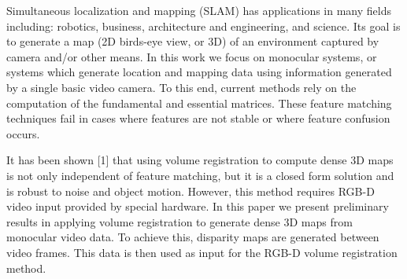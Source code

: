 Simultaneous localization and mapping (SLAM) has applications in many fields including: robotics, business, architecture and engineering, and science. Its goal is to generate a map (2D birds-eye view, or 3D) of an environment captured by camera and/or other means. In this work we focus on monocular systems, or systems which generate location and mapping data using information generated by a single basic video camera. To this end, current methods rely on the computation of the fundamental and essential matrices. These feature matching techniques fail in cases where features are not stable or where feature confusion occurs. 

It has been shown [1] that using volume registration to compute dense 3D maps is not only independent of feature matching, but it is a closed form solution and is robust to noise and object motion. However, this method requires RGB-D video input provided by special hardware. In this paper we present preliminary results in applying volume registration to generate dense 3D maps from monocular video data. To achieve this, disparity maps are generated between video frames. This data is then used as input for the RGB-D volume registration method.
